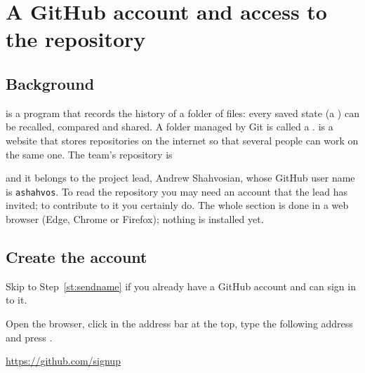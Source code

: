 \section{A GitHub account and access to the repository}
\label{sec:github}

\subsection{Background}

 is a program that records the history of a folder of files: every saved state (a
) can be recalled, compared and shared. A folder managed by Git is called a
.  is a website that stores repositories on the internet so that
several people can work on the same one. The team's repository is

\begin{center}
\repourl
\end{center}

and it belongs to the project lead, Andrew Shahvosian, whose GitHub user name is
\texttt{ashahvos}. To read the repository you may need an account that the lead has invited; to
contribute to it you certainly do. The whole section is done in a web browser (Edge, Chrome or
Firefox); nothing is installed yet.

\subsection{Create the account}

Skip to Step~\ref{st:sendname} if you already have a GitHub account and can sign in to it.

Open the browser, click in the address bar at the top, type the following address and press
.
\begin{center}\url{https://github.com/signup}\end{center}

